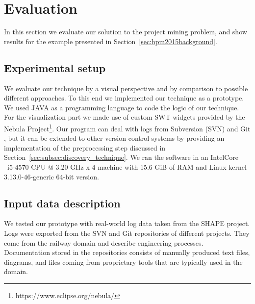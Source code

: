 \section{Evaluation}\label{sec:bpm2015evaluation}

In this section we evaluate our solution to the project mining problem, and show results for the example presented in Section~\ref{sec:bpm2015background}.

\subsection{Experimental setup}

%

We evaluate our technique by a visual perspective and by comparison to possible different approaches. To this end we implemented our technique as a prototype. We used JAVA as a programming language to code the logic of our technique. For the visualization part we made use of custom SWT widgets provided by the Nebula Project\footnote{https://www.eclipse.org/nebula/}. Our program can deal with logs from Subversion (SVN)  \citep{pilato2008version} and Git \citep{torvalds2010git}, but it can be extended to other version control systems by providing an implementation of the preprocessing step discussed in Section~\ref{sec:subsec:discovery_technique}.
We ran the software in an Intel\textregistered Core \texttrademark~i5-4570 CPU @ 3.20 GHz x 4 machine with 15.6 GiB of RAM and Linux kernel 3.13.0-46-generic 64-bit version.

\subsection{Input data description}

We tested our prototype with real-world log data taken from the SHAPE project. Logs were exported from the SVN and Git repositories of different projects. They come from the railway domain and describe engineering processes. Documentation stored in the repositories consists of manually produced text files, diagrams, and files coming from proprietary tools that are typically used in the domain.

